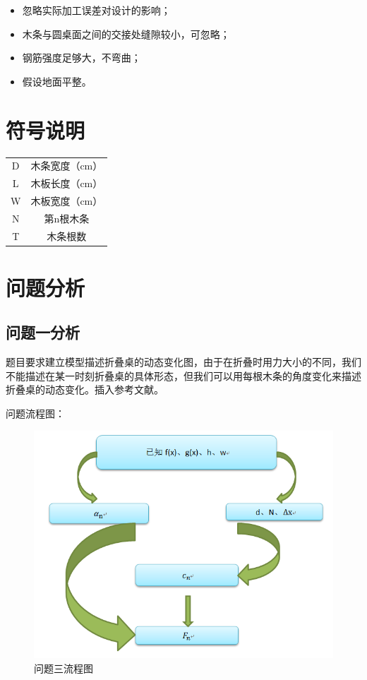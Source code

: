 \documentclass{whutmod}
\begin{document}
\begin{itemize}
	\item 忽略实际加工误差对设计的影响；
	\item 木条与圆桌面之间的交接处缝隙较小，可忽略；
	\item 钢筋强度足够大，不弯曲；
	\item 假设地面平整。
\end{itemize}

\section{符号说明}
\begin{center}
	\begin{tabular}{cc}
		\hline
		\makebox[0.3\textwidth][c]{符号}	&  \makebox[0.4\textwidth][c]{意义} \\ \hline
		D	    & 木条宽度（cm） \\ \hline
		L	    & 木板长度（cm）  \\ \hline
		W	    & 木板宽度（cm）  \\ \hline
		N	    & 第n根木条  \\ \hline
		T	    & 木条根数  \\ \hline
	\end{tabular}
\end{center}

\section{问题分析}

\subsection{问题一分析}
题目要求建立模型描述折叠桌的动态变化图，由于在折叠时用力大小的不同，我们不能描述在某一时刻折叠桌的具体形态，但我们可以用每根木条的角度变化来描述折叠桌的动态变化。插入参考文献\cite{bib:one}。

问题流程图：
\begin{figure}[!h]
	\centering
	\includegraphics[width=.6\textwidth]{1.png}
	\caption{问题三流程图}
\end{figure}
\end{document}
